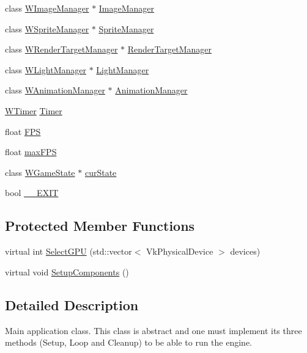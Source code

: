 \begin{DoxyCompactItemize}
\item 
class \hyperlink{class_w_image_manager}{W\+Image\+Manager} $\ast$ \hyperlink{class_wasabi_ad9d10e5810138d95baba904304f8cabd}{Image\+Manager}
\item 
class \hyperlink{class_w_sprite_manager}{W\+Sprite\+Manager} $\ast$ \hyperlink{class_wasabi_acfadaed04b0685921e3029e0b2e15c8b}{Sprite\+Manager}
\item 
class \hyperlink{class_w_render_target_manager}{W\+Render\+Target\+Manager} $\ast$ \hyperlink{class_wasabi_aa2f6499ce71220726f09a0b8679c88c6}{Render\+Target\+Manager}
\item 
class \hyperlink{class_w_light_manager}{W\+Light\+Manager} $\ast$ \hyperlink{class_wasabi_ae21477374d8c2b7f39d0fe603796a23e}{Light\+Manager}
\item 
class \hyperlink{class_w_animation_manager}{W\+Animation\+Manager} $\ast$ \hyperlink{class_wasabi_a9a1e34c39644eae792e00db759808375}{Animation\+Manager}
\item 
\hyperlink{class_w_timer}{W\+Timer} \hyperlink{class_wasabi_a05041643bd932c46b688cc6a941e99c7}{Timer}
\item 
float \hyperlink{class_wasabi_a28397bc5824cf3f18fa1363a3347a5d1}{F\+PS}
\item 
float \hyperlink{class_wasabi_ab2de064f8da21ad5474be7eb1884023d}{max\+F\+PS}
\item 
class \hyperlink{class_w_game_state}{W\+Game\+State} $\ast$ \hyperlink{class_wasabi_ae7101b326042bdf4a48eacae05bcb585}{cur\+State}
\item 
bool \hyperlink{class_wasabi_a9ac08097b7fa8f82d2c9f102bd94e1d3}{\+\_\+\+\_\+\+E\+X\+IT}
\end{DoxyCompactItemize}
\subsection*{Protected Member Functions}
\begin{DoxyCompactItemize}
\item 
virtual int \hyperlink{class_wasabi_ad39733cacc717e182ebdf4244e1906fa}{Select\+G\+PU} (std\+::vector$<$ Vk\+Physical\+Device $>$ devices)
\item 
virtual void \hyperlink{class_wasabi_aa7a75464cffa49cd60ad18f3ed245218}{Setup\+Components} ()
\end{DoxyCompactItemize}


\subsection{Detailed Description}
Main application class. This class is abstract and one must implement its three methods (Setup, Loop and Cleanup) to be able to run the engine. 

